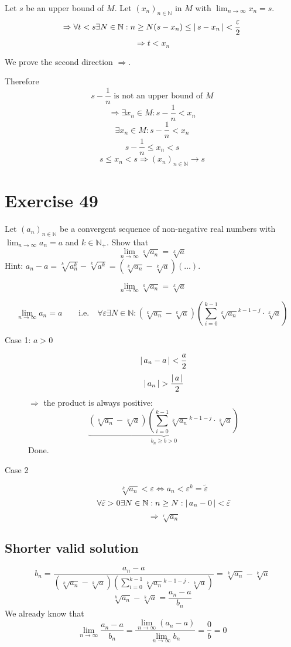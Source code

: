 \documentclass[a4paper]{article}
\theoremstyle{definition}
\newcommand\abs[1]{\left|\thinspace #1\thinspace\right|}
\begin{document}
Let $s$ be an upper bound of $M$.
Let $(x_n)_{n \in \mathbb N}$ in $M$ with $\lim_{n\to\infty} x_n = s$.
\[ \Rightarrow \forall t < s \exists N \in \mathbb N: n \geq N(s - x_n) \leq \abs{s-x_n} < \frac{\varepsilon}{2} \]
\[ \Rightarrow t < x_n \]

We prove the second direction $\Rightarrow$.

Therefore
\[ s - \frac1n \text{ is not an upper bound of } M \]
\[ \Rightarrow \exists x_n \in M: s - \frac1n < x_n \]
\[ \exists x_n \in M: s - \frac1n < x_n \]
\[ s - \frac1n \leq x_n < s \]
\[ s \leq x_n < s \Rightarrow (x_n)_{n\in\mathbb N} \to s \]


\section{Exercise 49}
\begin{ex}
  Let $(a_n)_{n\in\mathbb N}$ be a convergent sequence of non-negative real numbers
  with $\lim_{n\to\infty} a_n = a$ and $k \in \mathbb N_+$. Show that
  \[ \lim_{n\to\infty} \sqrt[k]{a_n} = \sqrt[k]{a} \]
  Hint: $a_n - a = \sqrt[k]{a_n^k} - \sqrt[k]{a^k} = (\sqrt[k]{a_n} - \sqrt[k]{a}) (\dots)$.
\end{ex}

\[ \lim_{n\to\infty} \sqrt[k]{a_n} = \sqrt[k]{a} \]

\[
    \lim_{n\to\infty} a_n = a \qquad \text{i.e.} \quad \forall \varepsilon \exists N \in \mathbb N:
    \left(\sqrt[k]{a_n} - \sqrt[k]{a}\right) \left(\sum_{i=0}^{k-1} \sqrt[k]{a_n}^{k-1-j} \cdot \sqrt[k]{a}\right)
\]

\begin{description}
  \item[Case 1: $a > 0$]
    \[ \abs{a_n - a} < \frac{a}{2} \]
    \[ \abs{a_n} > \frac{\abs{a}}{2} \]
    $\Rightarrow$ the product is always positive:
    \[ \underbrace{\left(\sqrt[k]{a_n} - \sqrt[k]{a}\right) \left(\sum_{i=0}^{k-1} \sqrt[k]{a_n}^{k-1-j} \cdot \sqrt[k]{a}\right)}_{b_n \geq b > 0} \]
    Done.
  \item[Case 2]
    \[ \sqrt[k]{a_n} < \varepsilon \Leftrightarrow a_n < \varepsilon^k = \tilde\varepsilon \]
    \[ \forall \tilde\varepsilon > 0 \exists N \in \mathbb N: n \geq N: \abs{a_n - 0} < \tilde\varepsilon \]
    \[ \Rightarrow \sqrt[r]{a_n} \]
\end{description}

\subsection{Shorter valid solution}
\[
  b_n
  = \frac{a_n - a}{\left(\sqrt[k]{a_n} - \sqrt[k]{a}\right) \left(\sum_{i=0}^{k-1} \sqrt[k]{a_n}^{k-1-j} \cdot \sqrt[k]{a}\right)}
  = \sqrt[k]{a_n} - \sqrt[k]{a}
\]
\[
  \sqrt[k]{a_n} - \sqrt[k]{a} = \frac{a_n - a}{b_n}
\]
We already know that
\[ \lim_{n\to\infty} \frac{a_n - a}{b_n} = \frac{\lim_{n\to\infty} (a_n - a)}{\lim_{n\to\infty} b_n} = \frac0b = 0 \]
\end{document}
